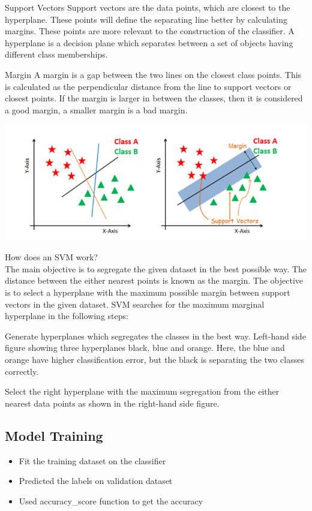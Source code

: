 \documentclass{article}
\begin{document}
Support Vectors Support vectors are the data points, which are closest to the hyperplane. These points will define the separating line better by calculating margins. These points are more relevant to the construction of the classifier.
A hyperplane is a decision plane which separates between a set of objects having different class memberships.

Margin A margin is a gap between the two lines on the closest class points. This is calculated as the perpendicular distance from the line to support vectors or closest points. If the margin is larger in between the classes, then it is considered a good margin, a smaller margin is a bad margin.
\
\begin{center}
\advance\leftskip-3cm
\advance\rightskip-3cm
    \includegraphics[]{figures/SVM.png}
\end{center}
How does an SVM work?\\

The main objective is to segregate the given dataset in the best possible way. The distance between the either nearest points is known as the margin. The objective is to select a hyperplane with the maximum possible margin between support vectors in the given dataset. SVM searches for the maximum marginal hyperplane in the following steps:

Generate hyperplanes which segregates the classes in the best way. Left-hand side figure showing three hyperplanes black, blue and orange. Here, the blue and orange have higher classification error, but the black is separating the two classes correctly.

Select the right hyperplane with the maximum segregation from the either nearest data points as shown in the right-hand side figure.

\subsection{Model Training}


\begin{itemize}
  \item Fit the training dataset on the classifier
  \item Predicted the labels on validation dataset
  \item Used accuracy\_score function to get the accuracy
\end{itemize}
\end{document}
